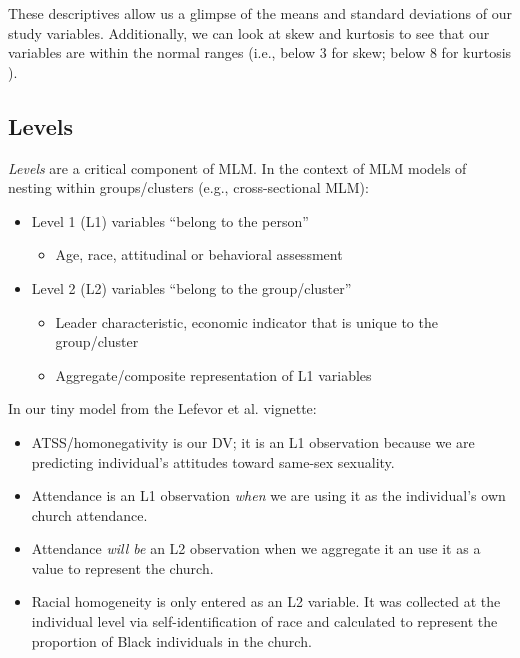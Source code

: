 \documentclass[
  english,
]{book}
\providecommand{\tightlist}{%
  \setlength{\itemsep}{0pt}\setlength{\parskip}{0pt}}
\begin{document}
These descriptives allow us a glimpse of the means and standard deviations of our study variables. Additionally, we can look at skew and kurtosis to see that our variables are within the normal ranges (i.e., below 3 for skew; below 8 for kurtosis \citep{kline_principles_2016}).

\hypertarget{levels}{%
\subsection{Levels}\label{levels}}

\emph{Levels} are a critical component of MLM. In the context of MLM models of nesting within groups/clusters (e.g., cross-sectional MLM):

\begin{itemize}
\tightlist
\item
  Level 1 (L1) variables ``belong to the person''

  \begin{itemize}
  \tightlist
  \item
    Age, race, attitudinal or behavioral assessment
  \end{itemize}
\item
  Level 2 (L2) variables ``belong to the group/cluster''

  \begin{itemize}
  \tightlist
  \item
    Leader characteristic, economic indicator that is unique to the group/cluster
  \item
    Aggregate/composite representation of L1 variables
  \end{itemize}
\end{itemize}

In our tiny model from the Lefevor et al. \citeyearpar{lefevor_homonegativity_2020} vignette:

\begin{itemize}
\tightlist
\item
  ATSS/homonegativity is our DV; it is an L1 observation because we are predicting individual's attitudes toward same-sex sexuality.
\item
  Attendance is an L1 observation \emph{when} we are using it as the individual's own church attendance.
\item
  Attendance \emph{will be } an L2 observation when we aggregate it an use it as a value to represent the church.
\item
  Racial homogeneity is only entered as an L2 variable. It was collected at the individual level via self-identification of race and calculated to represent the proportion of Black individuals in the church.
\end{itemize}
\end{document}

